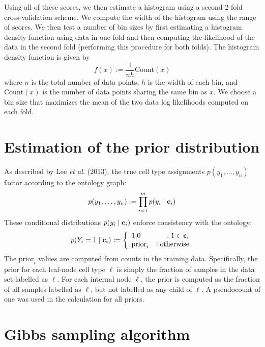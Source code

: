 Using all of these scores, we then estimate a histogram using a second 2-fold cross-validation scheme. We compute the width of the histogram using the range of scores. We then test a number of bin sizes by first estimating a histogram density function using data in one fold and then computing the likelihood of the data in the second fold (performing this procedure for both folds). The histogram density function is given by
$$f(x) := \frac{1}{nh}\text{Count}(x) $$
where $n$ is the total number of data points, $h$ is the width of each bin, and $\text{Count}(x)$ is the number of data points sharing the same bin as $x$. 
We choose a bin size that maximizes the mean of the two data log likelihoods computed on each fold.


\section{Estimation of the prior distribution }

As described by Lee \textit{et al.} (2013), the true cell type assignments $p(y_1, \dots, y_n)$ factor according to the ontology graph:
$$p(y_1, \dots, y_n) := \prod_{i=1}^m p(y_i \mid \bold{c}_i)$$
These conditional distributions $p(y_i \mid \bold{c}_i)$ enforce consistency with the ontology:
 $$p(Y_i=1 \mid \bold{c}_i) := \left\{
     \begin{array}{lr}
       1.0 & : 1 \in \bold{c}_i   \\
       \text{prior}_i & : \text{otherwise}
     \end{array}
     \right.$$
The $\text{prior}_i$ values are computed from counts in the training data. Specifically, the prior for each leaf-node cell type $\ell$ is simply the fraction of samples in the data set labelled as $\ell$.  For each internal node $\ell$, the prior is computed as the fraction of all samples  labelled as $\ell$, but not labelled as any child of $\ell$. A pseudocount of one was used in the calculation for all priors.

\section{Gibbs sampling algorithm }

